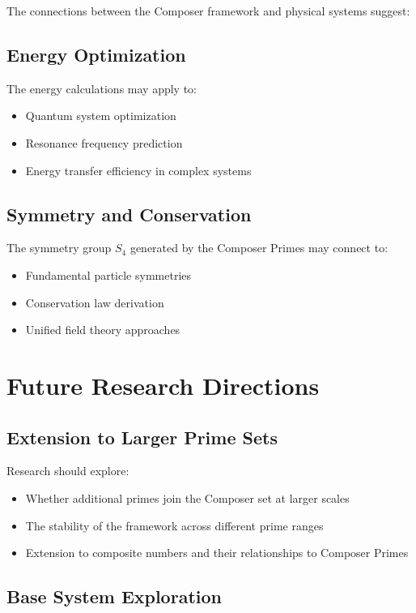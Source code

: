 \documentclass[12pt,a4paper]{report}
\begin{document}
The connections between the Composer framework and physical systems suggest:

\subsection{Energy Optimization}

The energy calculations may apply to:
\begin{itemize}
\item Quantum system optimization
\item Resonance frequency prediction
\item Energy transfer efficiency in complex systems
\end{itemize}

\subsection{Symmetry and Conservation}

The symmetry group $S_4$ generated by the Composer Primes may connect to:
\begin{itemize}
\item Fundamental particle symmetries
\item Conservation law derivation
\item Unified field theory approaches
\end{itemize}

\section{Future Research Directions}

\subsection{Extension to Larger Prime Sets}

Research should explore:
\begin{itemize}
\item Whether additional primes join the Composer set at larger scales
\item The stability of the framework across different prime ranges
\item Extension to composite numbers and their relationships to Composer Primes
\end{itemize}

\subsection{Base System Exploration}
\end{document}
